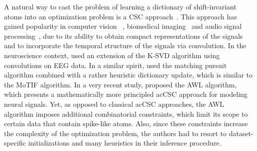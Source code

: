 
A natural way to cast the problem of learning a dictionary of shift-invariant atoms into an optimization problem is a \ac{CSC} approach~\cite{Grosse-etal:2007}. 
This approach has gained popularity in computer vision~\citep{heide2015fast,wohlberg2016efficient,zeiler2010deconvolutional, vsorel2016fast,kavukcuoglu2010learning}%
, biomedical imaging~\cite{pachitariu2013extracting} and audio signal processing~\citep{Grosse-etal:2007,mailhe2008shift},
due to its ability to obtain compact representations of the signals and to incorporate the temporal structure of the signals via convolution.
In the neuroscience context, \citet{barthelemy2013multivariate} used an extension of the K-SVD algorithm using convolutions on EEG data. 
In a similar spirit, \citet{brockmeier2016learning} used the matching pursuit algorithm combined with a rather heuristic  
dictionary update, which is similar to the MoTIF algorithm. 
%
In a very recent study, \citet{hitziger2017adaptive} proposed the AWL algorithm, which presents a mathematically more principled ac{CSC} approach for modeling neural signals. Yet, as opposed to classical ac{CSC} approaches, the AWL algorithm imposes additional combinatorial  constraints, which limit its scope to certain data that contain spike-like atoms. Also, since these constraints increase the complexity of the optimization problem, the authors had to resort to dataset-specific initializations and many heuristics in their inference procedure.

